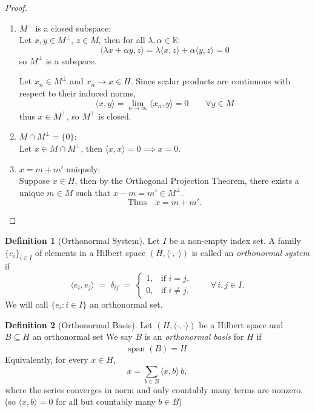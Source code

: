 \documentclass[11pt,a4paper]{article}
\theoremstyle{definition}
\newtheorem{definition}{Definition}[section]
\begin{document}
\newpage

\begin{proof} $ $
\begin{enumerate}
    \item $M^\perp$ is a closed subspace: \\
        Let $x, y \in M^\perp$, $z \in M$, then for all $\lambda, \alpha \in \mathbb{K}$:
        \[
        \langle \lambda x + \alpha y, z \rangle = \lambda \langle x, z \rangle + \alpha \langle y, z \rangle = 0
        \]
        so $M^\perp$ is a subspace.

        Let $x_n \in M^\perp$ and $x_n \to x \in H$. Since scalar products are continuous with respect to their induced norms,
        \[
        \langle x, y \rangle = \lim_{n \to \infty} \langle x_n, y \rangle = 0 \qquad \forall y \in M
        \]
        thus $x \in M^\perp$, so $M^\perp$ is closed.

    \item $M \cap M^\perp = \{0\}$: ~\\
        Let $x \in M \cap M^\perp$, then $\langle x, x \rangle = 0 \implies x = 0$.

    \item $x = m + m'$ uniquely:~\\
        Suppose $x \in H$, then by the Orthogonal Projection Theorem, there exists a unique $m \in M$ such that $x - m = m' \in M^\perp$.
        \[
        \text{Thus} \quad x = m + m'.
        \]
\end{enumerate}
\end{proof}

\begin{definition}[Orthonormal System]\label{def:orthonormal-system}
Let $I$ be a non-empty index set. A family $\{e_i\}_{i \in I}$ of elements in a Hilbert space $(H,\langle\cdot,\cdot\rangle)$ is called an \emph{orthonormal system} if
\[
\langle e_i, e_j \rangle \;=\; \delta_{ij} \;=\;
\begin{cases}
1, & \text{if } i = j, \\[2mm]
0, & \text{if } i \neq j,
\end{cases}
\qquad \forall\, i,j \in I.
\]
We will call $\{e_i: i \in I\}$ an orthonormal set.
\end{definition}


\begin{definition}[Orthonormal Basis]
Let $(H,\langle\cdot,\cdot\rangle)$ be a Hilbert space and 
$B \subseteq H$ an orthonormal set 
We say $B$ is an \emph{orthonormal basis} for $H$ if
\[
\overline{\operatorname{span}(B)} = H.
\]
Equivalently, for every $x \in H$,
\[
x = \sum_{b \in B} \langle x, b\rangle\, b,
\]
where the series converges in norm and only countably many terms are nonzero. (so $\langle x, b \rangle = 0$ for all but countably many $b \in B$)
\end{definition}
\end{document}
